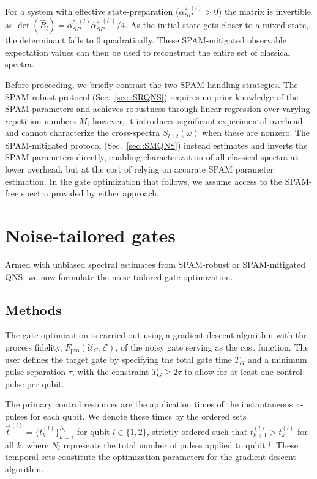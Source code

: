 \documentclass[%
 reprint,
superscriptaddress,
 amsmath,amssymb,
 aps,
pra,
floatfix,
]{revtex4-2}
\newcommand{\qk}[1]{{\color{OliveGreen}#1}}
\begin{document}
For a system with effective state-preparation ($\alpha_{SP}^{z,(l)}>0$) the matrix is invertible as $\det(\hat{B}_l)=\hat{\alpha}_{SP}^{z,(l)}\hat{\alpha}_{SP}^{z,(l')}/4$. As the initial state gets closer to a mixed state, the determinant falls to 0 quadratically. These SPAM-mitigated observable expectation values can then be used to reconstruct the entire set of classical spectra.

\qk{Before proceeding, we briefly contrast the two SPAM-handling strategies. The SPAM-robust protocol (Sec.~\ref{sec::SRQNS}) requires no prior knowledge of the SPAM parameters and achieves robustness through linear regression over varying repetition numbers $M$; however, it introduces significant experimental overhead and cannot characterize the cross-spectra $S_{l,12}(\omega)$ when these are nonzero. The SPAM-mitigated protocol (Sec.~\ref{sec::SMQNS}) instead estimates and inverts the SPAM parameters directly, enabling characterization of all classical spectra at lower overhead, but at the cost of relying on accurate SPAM parameter estimation. In the gate optimization that follows, we assume access to the SPAM-free spectra provided by either approach.}

\section{Noise-tailored gates}
\label{sec::optGates}

\qk{Armed with unbiased spectral estimates from SPAM-robust or SPAM-mitigated QNS, we now formulate the noise-tailored gate optimization.}

\subsection{Methods}
The gate optimization is carried out using a gradient-descent algorithm with the process fidelity, $F_{\text{pro}}(\mathcal{U}_G, \mathcal{E})$, of the noisy gate serving as the cost function. The user defines the target gate by specifying the total gate time $T_G$ and a minimum pulse separation $\tau$, with the constraint $T_G \geq 2\tau$ to allow for at least one control pulse per qubit. 

The primary control resources are the application times of the instantaneous $\pi$-pulses for each qubit. We denote these times by the ordered sets $\vec{t}^{(l)} = \{t_k^{(l)}\}_{k=1}^{N_l}$ for qubit $l \in \{1, 2\}$, strictly ordered such that $t_{k+1}^{(l)} > t_k^{(l)}$ for all $k$, where $N_l$ represents the total number of pulses applied to qubit $l$. These temporal sets constitute the optimization parameters for the gradient-descent algorithm.
\end{document}
